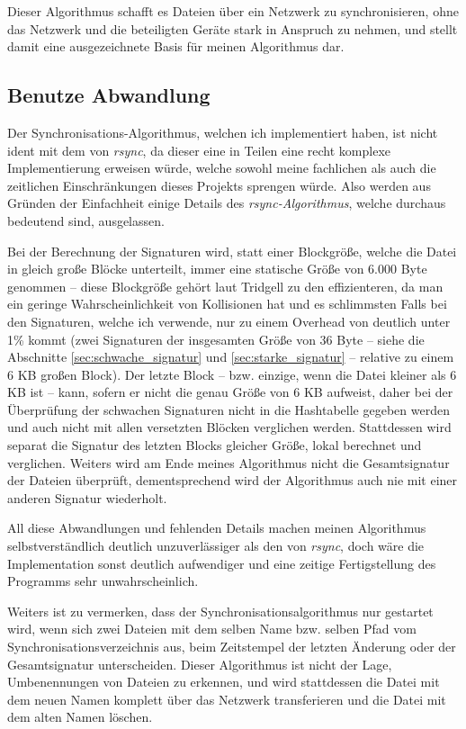 Dieser Algorithmus schafft es Dateien über ein Netzwerk zu synchronisieren, ohne das Netzwerk und die beteiligten Geräte stark in Anspruch zu nehmen,
und stellt damit eine ausgezeichnete Basis für meinen Algorithmus dar.

\subsection{Benutze Abwandlung}

Der Synchronisations-Algorithmus, welchen ich implementiert haben, ist nicht ident mit dem von \textit{rsync}, da dieser eine in Teilen eine recht
komplexe Implementierung erweisen würde, welche sowohl meine fachlichen als auch die zeitlichen Einschränkungen dieses Projekts sprengen würde. 
Also werden aus Gründen der Einfachheit einige Details des \textit{rsync-Algorithmus}, welche durchaus bedeutend sind, ausgelassen.

Bei der Berechnung der Signaturen wird, statt einer Blockgröße, welche die Datei in gleich große Blöcke unterteilt\cite{Tridgell99}, 
immer eine statische Größe von 6.000 Byte genommen -- diese Blockgröße gehört laut Tridgell zu den effizienteren, da man ein geringe Wahrscheinlichkeit
von Kollisionen hat und es schlimmsten Falls bei den Signaturen, welche ich verwende, nur zu einem Overhead von deutlich unter 1\% kommt (zwei
Signaturen der insgesamten Größe von 36 Byte -- siehe die Abschnitte \ref{sec:schwache_signatur} und \ref{sec:starke_signatur} -- relative zu einem 6 KB 
großen Block). Der letzte Block -- bzw. einzige, wenn die Datei kleiner als 6 KB ist -- kann, sofern er nicht die genau Größe von 6 KB aufweist, daher bei der 
Überprüfung der schwachen Signaturen nicht in die Hashtabelle gegeben werden und auch nicht mit allen versetzten Blöcken verglichen werden. 
Stattdessen wird separat die Signatur des letzten Blocks gleicher Größe, lokal berechnet und verglichen. Weiters wird am Ende meines Algorithmus nicht die 
Gesamtsignatur der Dateien überprüft, dementsprechend wird der Algorithmus auch nie mit einer anderen Signatur wiederholt.

All diese Abwandlungen und fehlenden Details machen meinen Algorithmus selbstverständlich deutlich unzuverlässiger als den von \textit{rsync},
doch wäre die Implementation sonst deutlich aufwendiger und eine zeitige Fertigstellung des Programms sehr unwahrscheinlich.

Weiters ist zu vermerken, dass der Synchronisationsalgorithmus nur gestartet wird, wenn sich zwei Dateien mit dem selben Name bzw. selben Pfad vom
Synchronisationsverzeichnis aus, beim Zeitstempel der letzten Änderung oder der Gesamtsignatur unterscheiden.
Dieser Algorithmus ist nicht der Lage, Umbenennungen von Dateien zu erkennen, und wird stattdessen die Datei mit dem neuen Namen komplett über 
das Netzwerk transferieren und die Datei mit dem alten Namen löschen.

